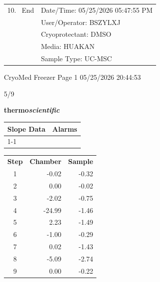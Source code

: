 \documentclass[UTF8,10pt,a4paper,fontset=fandol]{ctexart}
\newcommand{\fieldvalue}[1]{#1}
\newcommand{\handwritten}[1]{#1}
\begin{document}
\begin{tabularx}{\textwidth}{@{}X@{\hspace{1em}}X@{}}
\begin{minipage}[t]{\linewidth}
10.\ %
\fieldvalue{End}
\end{minipage}
&
Date/Time:
\fieldvalue{05/25/2026 05:47:55 PM}
\\[2pt]

&
User/Operator:
\fieldvalue{BSZYLXJ}
\\[2pt]

&
Cryoprotectant:
\fieldvalue{DMSO}
\\[2pt]

&
Media:
\fieldvalue{HUAKAN}
\\[2pt]

&
Sample Type:
\fieldvalue{UC-MSC}
\\
\end{tabularx}

\vfill

\noindent
CryoMed Freezer \hfill Page 1 \hfill 05/25/2026 20:44:53

\handwritten{5/9}

\newpage

\noindent\textbf{thermo\textit{scientific}}

\vspace{1em}

\begin{tabularx}{\textwidth}{@{}p{}X@{}}
\centering\textbf{Slope Data} & \centering\textbf{Alarms} \tabularnewline
\cline{1-1}\cline{2-2}
\end{tabularx}

\begin{tabular}{c r r}
\textbf{Step} & \textbf{Chamber} & \textbf{Sample} \\
1 & -0.02 & -0.32 \\
2 & 0.00 & -0.02 \\
3 & -2.02 & -0.75 \\
4 & -24.99 & -1.46 \\
5 & 2.23 & -1.49 \\
6 & -1.00 & -0.29 \\
7 & 0.02 & -1.43 \\
8 & -5.09 & -2.74 \\
9 & 0.00 & -0.22 \\
\end{tabular}
\end{document}
